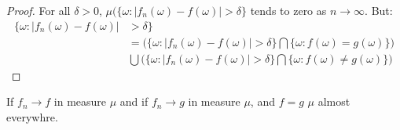             \begin{proof}
                For all $\delta>0$,
                $\mu(\{\omega:|f_{n}(\omega)-f(\omega)|>\delta\}$
                tends to zero as $n\rightarrow\infty$. But:
                \begin{equation}
                    \begin{split}
                        \{\omega:|f_{n}(\omega)-f(\omega)|
                        &>\delta\}\\
                        &=\Big(
                            \{\omega:|f_{n}(\omega)-f(\omega)|>\delta\}
                            \bigcap
                            \{\omega:f(\omega)=g(\omega)\}
                        \Big)\\
                        &\bigcup\Big(
                            \{\omega:|f_{n}(\omega)-f(\omega)|>\delta\}
                            \bigcap
                            \{\omega:f(\omega)\ne{g}(\omega)\}
                        \Big)
                    \end{split}
                \end{equation}
            \end{proof}
            \begin{theorem}
                If $f_{n}\rightarrow{f}$ in measure $\mu$ and if
                $f_{n}\rightarrow{g}$ in measure $\mu$, and
                $f=g$ $\mu$ almost everywhre.
            \end{theorem}
